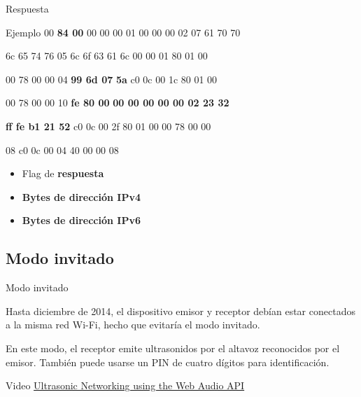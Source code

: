 \begin{frame}{Respuesta}
	\begin{exampleblock}{Ejemplo}
		 00 \textbf<2>{84 00} 00 00 00 01 \hspace{0.1cm} 00 00 00 02 07 61 70 70

		6c 65 74 76 05 6c 6f 63 \hspace{0.1cm} 61 6c 00 00 01 80 01 00

		00 78 00 00 04 \textbf<3>{99 6d 07} \hspace{0.1cm} \textbf<3>{5a} c0 0c 00 1c 80 01 00

		00 78 00 00 10 \textbf<4>{fe 80 00} \hspace{0.1cm} \textbf<4>{00 00 00 00 00 02 23 32}

		\textbf<4>{ff fe b1 21 52} c0 0c 00 \hspace{0.1cm} 2f 80 01 00 00 78 00 00

		08 c0 0c 00 04 40 00 00 \hspace{0.1cm} 08
	\end{exampleblock}
	
	\begin{itemize}
		\item Flag de \textbf<2>{respuesta}
		\item \textbf<3>{Bytes de dirección IPv4}
		\item \textbf<4>{Bytes de dirección IPv6}
	\end{itemize}
\end{frame}


\subsection{Modo invitado}
\begin{frame}{Modo invitado}
	\begin{block}{ }
		Hasta diciembre de 2014, el dispositivo emisor y receptor debían estar conectados a la misma red
		Wi-Fi, hecho que evitaría el modo invitado. 
		
		En este modo, el receptor emite ultrasonidos por el altavoz reconocidos por el emisor. También puede usarse un PIN de cuatro dígitos para identificación.
	\end{block}


	\begin{block}{Video}
	\href{https://www.youtube.com/watch?v=w6lRq5spQmc}{Ultrasonic Networking using the Web Audio API}
	\end{block}
\end{frame}


